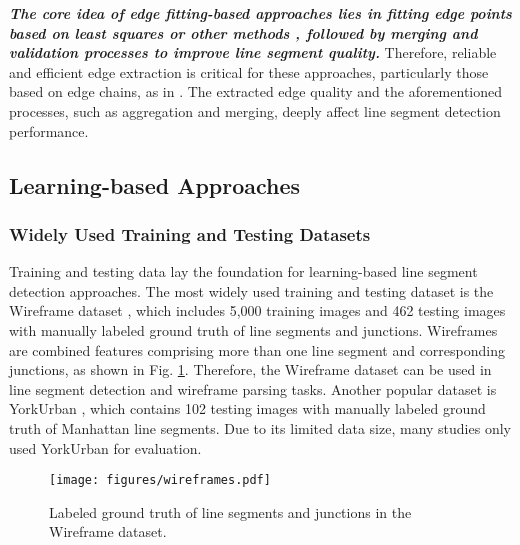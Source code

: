 \documentclass[journal,compsoc]{IEEEtran}
\begin{document}
\textbf{\textit{The core idea of edge fitting-based approaches lies in fitting edge points based on least squares or other methods \cite{Whatsinasetofpointsstraightlinefitting,232082}, followed by merging \cite{250848} and validation \cite{EDLines} processes to improve line segment quality.}} Therefore, reliable and efficient edge extraction is critical for these approaches, particularly those based on edge chains, as in \cite{EDLines,ELSED,E2LSD}. The extracted edge quality and the aforementioned processes, such as aggregation and merging, deeply affect line segment detection performance.


\subsection{Learning-based Approaches}
\label{subsec_detection_learning}
\subsubsection{Widely Used Training and Testing Datasets}
\label{subsubsec_detection_dataset}
Training and testing data lay the foundation for learning-based line segment detection approaches. The most widely used training and testing dataset is the Wireframe dataset \cite{LearningtoParseWireframesinImagesofMan-MadeEnvironments}, which includes 5,000 training images and 462 testing images with manually labeled ground truth of line segments and junctions. Wireframes are combined features comprising more than one line segment and corresponding junctions, as shown in Fig. \ref{Wireframes}. Therefore, the Wireframe dataset can be used in line segment detection and wireframe parsing tasks. Another popular dataset is YorkUrban \cite{YorkUrban, ANovelLineletBasedRepresentationforLineSegmentDetection}, which contains 102 testing images with manually labeled ground truth of Manhattan line segments. Due to its limited data size, many studies only used YorkUrban for evaluation.

\begin{figure}[tbp]
	\centering
	\texttt{[image: figures/wireframes.pdf]}
	\caption{Labeled ground truth of line segments and junctions in the Wireframe \cite{LearningtoParseWireframesinImagesofMan-MadeEnvironments} dataset.}
	\label{Wireframes}
\end{figure}
\end{document}
